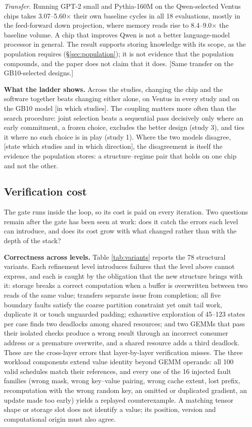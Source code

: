 \documentclass[11pt]{article}
\newcommand{\pending}[1]{\textcolor{red!65!black}{[#1]}}
\begin{document}
\emph{Transfer.} Running GPT-2 small and Pythia-160M on the Qwen-selected Ventus chips takes 3.07--5.60\(\times\) their own baseline cycles in all 18 evaluations, mostly in the feed-forward down projection, where memory reads rise to 8.4--9.0\(\times\) the baseline volume. A chip that improves Qwen is not a better language-model processor in general. The result supports storing knowledge with its scope, as the population requires (§\ref{sec:population}); it is not evidence that the population compounds, and the paper does not claim that it does. \pending{Same transfer on the GB10-selected designs.}

\textbf{What the ladder shows.} Across the studies, changing the chip and the software together beats changing either alone, on Ventus in every study and on the GB10 model \pending{in which studies}. The coupling matters more often than the search procedure: joint selection beats a sequential pass decisively only where an early commitment, a frozen choice, excludes the better design (study 3), and ties it where no such choice is in play (study 1). Where the two models disagree, \pending{state which studies and in which direction}, the disagreement is itself the evidence the population stores: a structure--regime pair that holds on one chip and not the other.

\subsection{Verification cost}\label{sec:eval-cost}

The gate runs inside the loop, so its cost is paid on every iteration. Two questions remain after the gate has been seen at work: does it catch the errors each level can introduce, and does its cost grow with what changed rather than with the depth of the stack?

\textbf{Correctness across levels.} Table \ref{tab:variants} reports the 78 structural variants. Each refinement level introduces failures that the level above cannot express, and each is caught by the obligation that the new structure brings with it: storage breaks a correct computation when a buffer is overwritten between two reads of the same value; transfers separate issue from completion; all five boundary faults satisfy the coarse partition constraint yet omit tail work, duplicate it or touch unguarded padding; exhaustive exploration of 45--123 states per case finds two deadlocks among shared resources; and two GEMMs that pass their isolated checks produce a wrong result through an incorrect consumer address or a premature overwrite, and a shared resource adds a third deadlock. These are the cross-layer errors that layer-by-layer verification misses. The three workload components extend value identity beyond GEMM operands: all 100 valid schedules match their references, and every one of the 16 injected fault families (wrong mask, wrong key--value pairing, wrong cache extent, lost prefix, recomputation with the wrong random key, an omitted or duplicated gradient, an update made too early) yields a replayed counterexample. A matching tensor shape or storage slot does not identify a value; its position, version and computational origin must also agree.
\end{document}
